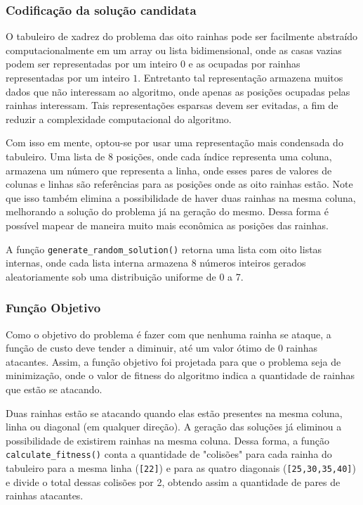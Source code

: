 \subsubsection{Codificação da solução candidata}

O tabuleiro de xadrez do problema das oito rainhas pode ser facilmente abstraído computacionalmente em um array ou lista bidimensional, onde as casas vazias podem ser representadas por um inteiro $0$ e as ocupadas por rainhas representadas por um inteiro $1$. Entretanto tal representação armazena muitos dados que não interessam ao algoritmo, onde apenas as posições ocupadas pelas rainhas interessam. Tais representações esparsas devem ser evitadas, a fim de reduzir a complexidade computacional do algoritmo.

Com isso em mente, optou-se por usar uma representação mais condensada do tabuleiro. Uma lista de 8 posições, onde cada índice representa uma coluna, armazena um número que representa a linha, onde esses pares de valores de colunas e linhas são referências para as posições onde as oito rainhas estão. Note que isso também elimina a possibilidade de haver duas rainhas na mesma coluna, melhorando a solução do problema já na geração do mesmo. Dessa forma é possível mapear de maneira muito mais econômica as posições das rainhas.

A função \verb*|generate_random_solution()| retorna uma lista com oito listas internas, onde cada lista interna armazena 8 números inteiros gerados aleatoriamente sob uma distribuição uniforme de 0 a 7.



\subsubsection{Função Objetivo}

Como o objetivo do problema é fazer com que nenhuma rainha se ataque, a função de custo deve tender a diminuir, até um valor ótimo de 0 rainhas atacantes. Assim, a função objetivo foi projetada para que o problema seja de minimização, onde o valor de fitness do algoritmo indica a quantidade de rainhas que estão se atacando.

Duas rainhas estão se atacando quando elas estão presentes na mesma coluna, linha ou diagonal (em qualquer direção). A geração das soluções já eliminou a possibilidade de existirem rainhas na mesma coluna. Dessa forma, a função \verb*|calculate_fitness()| conta a quantidade de "colisões" para cada rainha do tabuleiro para a mesma linha (\verb*|[22]|) e para as quatro diagonais (\verb*|[25,30,35,40]|) e divide o total dessas colisões por 2, obtendo assim a quantidade de pares de rainhas atacantes.\\

